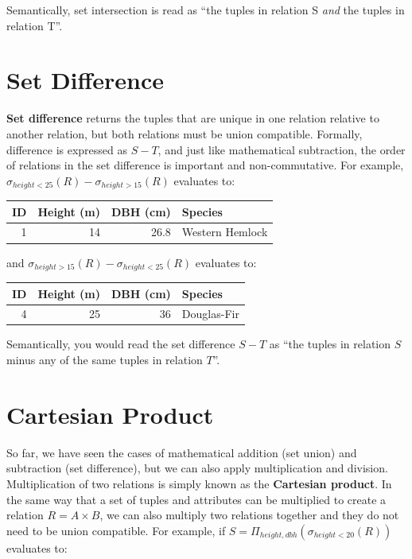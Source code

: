 \documentclass[
]{book}
\begin{document}
Semantically, set intersection is read as ``the tuples in relation S \emph{and} the tuples in relation T''.

\hypertarget{set-difference}{%
\section{Set Difference}\label{set-difference}}

\textbf{Set difference} returns the tuples that are unique in one relation relative to another relation, but both relations must be union compatible. Formally, difference is expressed as \(S-T\), and just like mathematical subtraction, the order of relations in the set difference is important and non-commutative. For example, \(σ_{height<25}(R)-σ_{height>15}(R)\) evaluates to:

\begin{tabular}{rrrl}
\toprule
ID & Height (m) & DBH (cm) & Species\\
\midrule
1 & 14 & 26.8 & Western Hemlock\\
\bottomrule
\end{tabular}

and \(σ_{height>15}(R)-σ_{height<25}(R)\) evaluates to:

\begin{tabular}{rrrl}
\toprule
ID & Height (m) & DBH (cm) & Species\\
\midrule
4 & 25 & 36 & Douglas-Fir\\
\bottomrule
\end{tabular}

Semantically, you would read the set difference \(S-T\) as ``the tuples in relation \(S\) minus any of the same tuples in relation \(T\)''.

\hypertarget{cartesian-product}{%
\section{Cartesian Product}\label{cartesian-product}}

So far, we have seen the cases of mathematical addition (set union) and subtraction (set difference), but we can also apply multiplication and division. Multiplication of two relations is simply known as the \textbf{Cartesian product}. In the same way that a set of tuples and attributes can be multiplied to create a relation \(R=A×B\), we can also multiply two relations together and they do not need to be union compatible. For example, if \(S = Π_{height,dbh}(σ_{height<20}(R))\) evaluates to:
\end{document}
